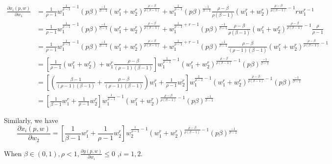 \documentclass{article}
\begin{document}
\begin{align*}
\frac{\partial x_i(p,w)}{\partial w_1} 
&=\frac{1}{\rho -1}w_1^{\frac{1}{\rho -1} -1} (p\beta)^{\frac{-1}{\beta - 1}}
(w_1^r + w_2^r)^{\frac{\rho -\beta}{\rho(\beta -1)}} +  
w_1^{\frac{1}{\rho -1}}  (p\beta)^{\frac{-1}{\beta - 1}} \frac{\rho -\beta}{\rho(\beta -1)}(w_1^r + w_2^r)^{\frac{\rho -\beta}{\rho(\beta -1)} -1} r w_1^{r -1} \\
&=\frac{1}{\rho -1}w_1^{\frac{1}{\rho -1} -1} (p\beta)^{\frac{-1}{\beta - 1}}
(w_1^r + w_2^r)^{\frac{\rho -\beta}{\rho(\beta -1)}} +  
w_1^{\frac{1}{\rho -1} + r -1}  (p\beta)^{\frac{-1}{\beta - 1}} \frac{\rho -\beta}{\rho(\beta -1)}(w_1^r + w_2^r)^{\frac{\rho -\beta}{\rho(\beta -1)} -1}  \frac{\rho}{\rho -1} \\
&=\frac{1}{\rho -1}w_1^{\frac{1}{\rho -1} -1} (p\beta)^{\frac{-1}{\beta - 1}}
(w_1^r + w_2^r)^{\frac{\rho -\beta}{\rho(\beta -1)}} +  
w_1^{\frac{1}{\rho -1} + r -1}  (p\beta)^{\frac{-1}{\beta - 1}} \frac{\rho -\beta}{(\rho -1)(\beta -1)}(w_1^r + w_2^r)^{\frac{\rho -\beta}{\rho(\beta -1)} -1}   \\
&= [\frac{1}{\rho -1} (w_1^r + w_2^r) + w_1^r \frac{\rho -\beta}{(\rho -1)(\beta -1)}] 
w_1^{\frac{1}{\rho -1} -1} (w_1^r + w_2^r)^{\frac{\rho -\beta}{\rho(\beta -1)} -1}(p\beta)^{\frac{-1}{\beta - 1}} \\
&= [(\frac{\beta -1}{(\rho -1)(\beta -1)} + \frac{\rho -\beta}{(\rho -1)(\beta -1)}) w_1^r + \frac{1}{\rho -1} w_2^r] 
w_1^{\frac{1}{\rho -1} -1} (w_1^r + w_2^r)^{\frac{\rho -\beta}{\rho(\beta -1)} -1}(p\beta)^{\frac{-1}{\beta - 1}} \\
&= [\frac{1}{\beta -1} w_1^r + \frac{1}{\rho -1} w_2^r] 
w_1^{\frac{1}{\rho -1} -1} (w_1^r + w_2^r)^{\frac{\rho -\beta}{\rho(\beta -1)} -1}(p\beta)^{\frac{-1}{\beta - 1}}
\end{align*}


Similarly, we have $$\frac{\partial x_i(p,w)}{\partial w_2} = [\frac{1}{\beta -1} w_1^r + \frac{1}{\rho -1} w_2^r] 
w_2^{\frac{1}{\rho -1} -1} (w_1^r + w_2^r)^{\frac{\rho -\beta}{\rho(\beta -1)} -1}(p\beta)^{\frac{-1}{\beta - 1}}
$$

When $\beta \in (0,1), \rho<1, \frac{\partial y(p,w)}{\partial w_i} \le 0$ ,$i = 1,2$.
\end{document}
